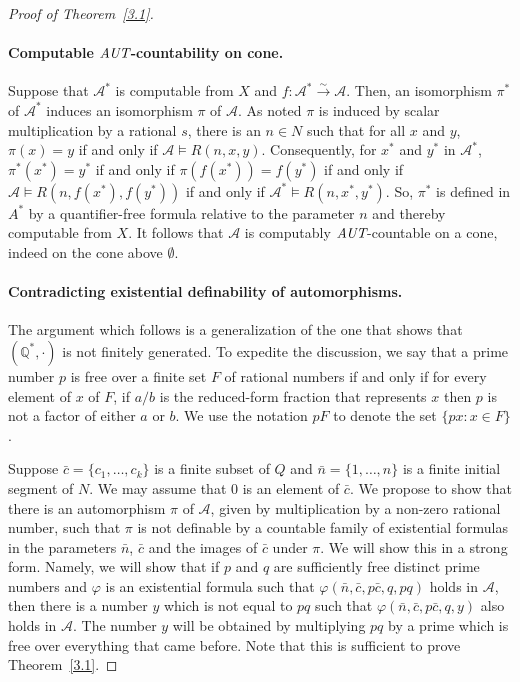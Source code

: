 \documentclass[12pt,fullpage]{article}
\theoremstyle{definition}
\theoremstyle{remark}
\newcommand{\A}{\mathcal{A}}
\newcommand{\Q}{{\mathbb{Q}}}
\renewcommand{\phi}{\varphi}
\newcommand{\AUT}{\mbox{\it AUT}}
\newcommand{\iso}{{\stackrel{\sim}{\rightarrow}}}
\begin{document}
\begin{proof}[Proof of Theorem~\ref{3.1}]
\paragraph{Computable $\AUT$-countability on cone.}  Suppose that $\A^*$ is computable from $X$ and $f:\A^*\iso \A$.  Then, an isomorphism $\pi^*$ of $\A^*$ induces an isomorphism $\pi$ of $\A$.  As noted $\pi$ is induced by scalar multiplication by a rational $s$, there is an $n\in N$ such that for all $x$ and $y$, $\pi(x)=y$ if and only if $\A\models R(n,x,y)$.  Consequently, for $x^*$ and $y^*$ in $\A^*$, $\pi^*(x^*)=y^*$ if and only if $\pi(f(x^*))=f(y^*)$ if and only if $\A\models R(n,f(x^*),f(y^*))$ if and only if $\A^*\models R(n,x^*,y^*)$.  So, $\pi^*$ is defined in $A^*$ by a quantifier-free formula relative to the parameter $n$ and thereby computable from $X$.  It follows that  $\A$ is computably $\AUT$-countable on a cone, indeed on the cone above $\emptyset$.

\paragraph{Contradicting existential definability of automorphisms.}

The argument which follows is a generalization of the one that shows that $(\Q^*,\cdot)$ is not finitely generated.  To expedite the discussion, we say that a prime number $p$ is free over a finite set $F$ of rational numbers if and only if for every element of $x$ of $F$, if $a/b$ is the reduced-form fraction that represents $x$ then $p$ is not a factor of either $a$ or $b$.  We use the notation $pF$ to denote the set $\{px: x\in F\}$.

Suppose $\bar{c}=\{c_1,\dots,c_k\}$  is a finite subset of $Q$ and $\bar{n}=\{1,\dots,n\}$ is a finite initial segment of $N$.  We may assume that $0$ is an element of $\bar{c}$.  We propose to show that there is an automorphism $\pi$ of $\A$, given by multiplication by a non-zero rational number, such that $\pi$ is not definable by a countable family of existential formulas in the parameters $\bar{n}$, $\bar{c}$ and the images of $\bar{c}$ under $\pi$.  We will show this in a strong form.  Namely, we will show that if $p$ and $q$ are sufficiently free distinct prime numbers  and $\phi$ is an existential formula such that $\phi(\bar{n},\bar{c},p\bar{c},q,pq)$ holds in $\A$, then there is a number $y$ which is not equal to $pq$ such that $\phi(\bar{n},\bar{c},p\bar{c},q,y)$ also holds in $\A$.  The number $y$ will be obtained by multiplying $pq$ by a prime which is free over everything that came before. Note that this is sufficient to prove Theorem~\ref{3.1}.


\end{proof}
\end{document}
